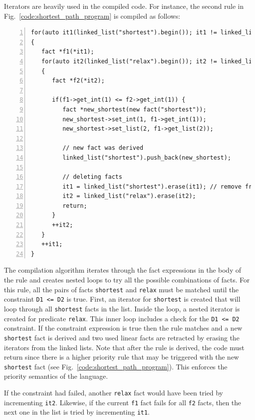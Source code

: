 Iterators are heavily used in the compiled code. For instance, the second rule in
Fig.~\ref{code:shortest_path_program} is compiled as follows:

\begin{Verbatim}[numbers=left,fontsize=\scriptsize]
for(auto it1(linked_list("shortest").begin()); it1 != linked_list("shortest").end(); )
{
   fact *f1(*it1);
   for(auto it2(linked_list("relax").begin()); it2 != linked_list("relax").end(); )
   {
      fact *f2(*it2);

      if(f1->get_int(1) <= f2->get_int(1)) {
         fact *new_shortest(new fact("shortest"));
         new_shortest->set_int(1, f1->get_int(1));
         new_shortest->set_list(2, f1->get_list(2));

         // new fact was derived
         linked_list("shortest").push_back(new_shortest);

         // deleting facts
         it1 = linked_list("shortest").erase(it1); // remove from list
         it2 = linked_list("relax").erase(it2);
         return;
      }
      ++it2;
   }
   ++it1;
}
\end{Verbatim}


The compilation algorithm iterates through the fact expressions in the body of
the rule and creates nested loops to try all the possible combinations of facts.
For this rule, all the pairs of facts \texttt{shortest} and \texttt{relax} must
be matched until the constraint \texttt{D1 <= D2} is true. First, an iterator
for \texttt{shortest} is created that will loop through all \texttt{shortest}
facts in the list. Inside the loop, a nested iterator is created for predicate
\texttt{relax}. This inner loop includes a check for the \texttt{D1 <= D2}
constraint. If the constraint expression is true then the rule matches and a new
\texttt{shortest} fact is derived and two used linear facts are retracted by
erasing the iterators from the linked lists. Note that after the rule is
derived, the code must return since there is a higher priority rule that may be
triggered with the new \texttt{shortest} fact (see
Fig.~\ref{code:shortest_path_program}). This enforces the priority semantics
of the language.
    
If the constraint had failed, another \texttt{relax} fact would have been tried
by incrementing \texttt{it2}. Likewise, if the current \texttt{f1} fact fails
for all \texttt{f2} facts, then the next one in the list is tried
by incrementing \texttt{it1}.

